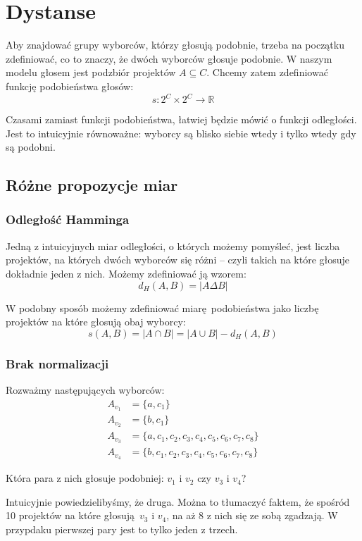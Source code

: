\documentclass{article}
\begin{document}
\section{Dystanse}

Aby znajdować grupy wyborców, którzy głosują podobnie, trzeba na początku
zdefiniować, co to znaczy, że dwóch wyborców głosuje podobnie. W naszym modelu
głosem jest podzbiór projektów $A \subseteq C$. Chcemy zatem zdefiniować
funkcję podobieństwa głosów:
\[ s : 2^C \times 2^C \to \mathbb{R} \]

Czasami zamiast funkcji podobieństwa, łatwiej będzie mówić o funkcji
odległości. Jest to intuicyjnie równoważne: wyborcy są blisko siebie wtedy i
tylko wtedy gdy są podobni.

\subsection{Różne propozycje miar}

\subsubsection{Odległość Hamminga}

Jedną z intuicyjnych miar odległości, o których możemy pomyśleć, jest liczba
projektów, na których dwóch wyborców się różni -- czyli takich na które głosuje
dokładnie jeden z nich. Możemy zdefiniować ją wzorem:
\[ d_H(A,B) = |A \Delta B| \]

W podobny sposób możemy zdefiniować miarę podobieństwa jako liczbę projektów
na które głosują obaj wyborcy:
\[ s(A,B) = |A \cap B| = |A \cup B| - d_H(A,B) \]

\subsubsection*{Brak normalizacji}

Rozważmy następujących wyborców:
\begin{align*}
  A_{v_1} &= \{ a, c_1 \} \\
  A_{v_2} &= \{ b, c_1 \} \\
  A_{v_3} &= \{ a, c_1, c_2, c_3, c_4, c_5, c_6, c_7, c_8 \} \\
  A_{v_4} &= \{ b, c_1, c_2, c_3, c_4, c_5, c_6, c_7, c_8 \}
\end{align*}

Która para z nich głosuje podobniej: $v_1$ i $v_2$ czy $v_3$ i $v_4$?

Intuicyjnie powiedzielibyśmy, że druga. Można to tłumaczyć faktem, że spośród
10 projektów na które głosują $v_3$ i $v_4$, na aż 8 z nich się ze sobą
zgadzają. W przypdaku pierwszej pary jest to tylko jeden z trzech.
\end{document}
